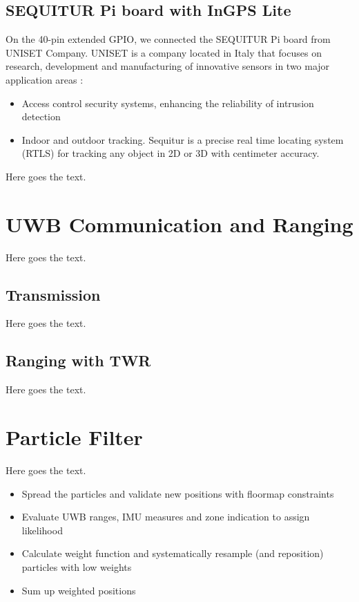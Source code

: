 \subsection{SEQUITUR Pi board with InGPS Lite}
On the 40-pin extended GPIO, we connected the SEQUITUR Pi board from UNISET Company. UNISET is a company located in Italy that focuses on research, development and manufacturing of innovative sensors in two major application areas \cite{Uniset}:

\begin{itemize}
\item Access control security systems, enhancing the reliability of intrusion detection
\item Indoor and outdoor tracking. Sequitur is a precise real time locating system (RTLS) for tracking any object in 2D or 3D with centimeter accuracy.
\end{itemize}
Here goes the text.


\section{UWB Communication and Ranging}
Here goes the text.

\subsection{Transmission}
Here goes the text.
\subsection{Ranging with TWR}
Here goes the text.


\section{Particle Filter}
Here goes the text.
\begin{itemize}
\item Spread the particles and validate new positions with floormap constraints
\item Evaluate UWB ranges, IMU measures and zone indication to assign likelihood
\item Calculate weight function and systematically resample (and reposition) particles with low weights
\item Sum up weighted positions
\end{itemize}

